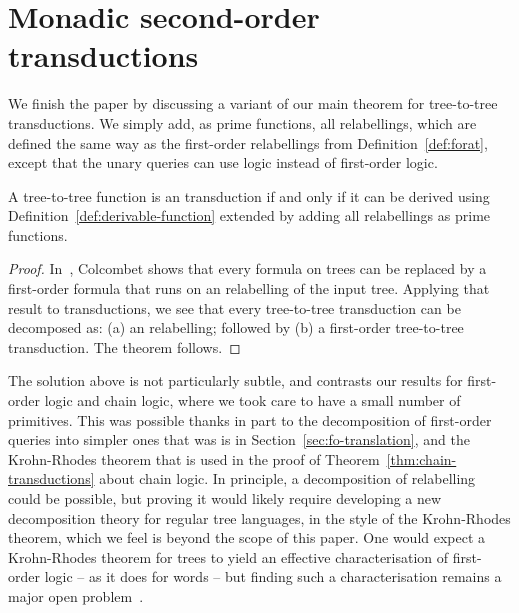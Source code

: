 \section{Monadic second-order transductions}
\label{sec:mso-trans}
We finish the paper by discussing a variant of our main theorem for   \mso tree-to-tree transductions. 
We simply add, as prime functions, all \mso relabellings, which are defined the  same way as the first-order relabellings from Definition~\ref{def:forat}, except that the unary queries can use \mso logic instead of first-order logic. 

\begin{theorem}\label{thm:mso-transductions}
    A tree-to-tree function is an \mso  transduction if and only if it can be derived  using  Definition~\ref{def:derivable-function}  extended by  adding  all \mso relabellings as prime functions. 
\end{theorem}
\begin{proof}
    In~\cite[Corollary 1]{colcombetCombinatorialTheoremTrees2007}, Colcombet shows that every \mso formula on trees can be replaced by a first-order formula that runs on an \mso relabelling of the input tree. Applying that result to transductions, we see that every \mso tree-to-tree transduction can be decomposed as: (a) an \mso relabelling; followed by (b) a first-order tree-to-tree transduction.  The theorem follows.
\end{proof}
The solution above is not particularly subtle, and contrasts our results for  first-order logic and chain logic, where  we took care to have a small number of primitives. This  was possible thanks in part to the decomposition of first-order queries into simpler ones that was is in Section~\ref{sec:fo-translation}, and the Krohn-Rhodes theorem that is used in the proof of Theorem~\ref{thm:chain-transductions} about chain logic.  In principle,  a decomposition of \mso relabelling could be possible, but proving it  would likely require developing a new decomposition  theory for regular tree languages, in the style of the Krohn-Rhodes theorem, which we feel is beyond the scope of this paper. One would expect a Krohn-Rhodes theorem  for trees to yield an effective characterisation of first-order logic -- as it does for words -- but finding such a characterisation remains a major open problem~\cite[Section 3]{bojanczyk2015automata}. 



